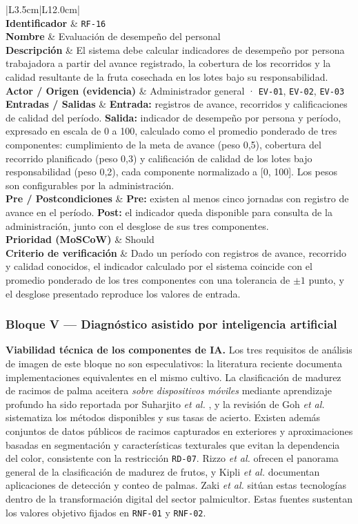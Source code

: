 \documentclass[11pt,a4paper]{article}
\newcommand{\id}[1]{\texttt{\begingroup\hyphenpenalty=10000\relax#1\endgroup}}
\renewcommand{\id}[1]{\texttt{#1}}
\newcommand{\RF}[8]{%
\begin{longtable}{|L{3.5cm}|L{12.0cm}|}
\hline
\rowcolor{grisclaro}\multicolumn{2}{|p{15.7cm}|}{\textbf{#1 --- #2}}\\
\hline
\textbf{Identificador} & \id{#1} \\ \hline
\textbf{Nombre} & #2 \\ \hline
\textbf{Descripción} & #3 \\ \hline
\textbf{Actor / Origen (evidencia)} & #4 \\ \hline
\textbf{Entradas / Salidas} & #5 \\ \hline
\textbf{Pre / Postcondiciones} & #6 \\ \hline
\textbf{Prioridad (MoSCoW)} & #7 \\ \hline
\textbf{Criterio de verificación} & #8 \\ \hline
\caption{#1 --- #2}
\end{longtable}
\vspace{-0.3cm}
}
\begin{document}
\RF{RF-16}{Evaluación de desempeño del personal}
{El sistema debe calcular indicadores de desempeño por persona trabajadora a partir del avance registrado, la cobertura de los recorridos y la calidad resultante de la fruta cosechada en los lotes bajo su responsabilidad.}
{Administrador general · \id{EV-01}, \id{EV-02}, \id{EV-03}}
{\textbf{Entrada:} registros de avance, recorridos y calificaciones de calidad del período. \textbf{Salida:} indicador de desempeño por persona y período, expresado en escala de 0 a 100, calculado como el promedio ponderado de tres componentes: cumplimiento de la meta de avance (peso 0,5), cobertura del recorrido planificado (peso 0,3) y calificación de calidad de los lotes bajo responsabilidad (peso 0,2), cada componente normalizado a [0, 100]. Los pesos son configurables por la administración.}
{\textbf{Pre:} existen al menos cinco jornadas con registro de avance en el período. \textbf{Post:} el indicador queda disponible para consulta de la administración, junto con el desglose de sus tres componentes.}
{Should}
{Dado un período con registros de avance, recorrido y calidad conocidos, el indicador calculado por el sistema coincide con el promedio ponderado de los tres componentes con una tolerancia de $\pm 1$ punto, y el desglose presentado reproduce los valores de entrada.}

\subsubsection{Bloque V --- Diagnóstico asistido por inteligencia artificial}

\noindent\textbf{Viabilidad técnica de los componentes de IA.} Los tres requisitos de análisis de
imagen de este bloque no son especulativos: la literatura reciente documenta implementaciones
equivalentes en el mismo cultivo. La clasificación de madurez de racimos de palma aceitera
\emph{sobre dispositivos móviles} mediante aprendizaje profundo ha sido reportada por Suharjito
\emph{et al.} \cite{suharjito2021}, y la revisión de Goh \emph{et al.} \cite{goh2025} sistematiza
los métodos disponibles y sus tasas de acierto. Existen además conjuntos de datos públicos de
racimos capturados en exteriores \cite{omar2024} y aproximaciones basadas en segmentación y
características texturales \cite{rosbi2024} que evitan la dependencia del color, consistente con la
restricción \id{RD-07}. Rizzo \emph{et al.} \cite{rizzo2023} ofrecen el panorama general de la
clasificación de madurez de frutos, y Kipli \emph{et al.} \cite{kipli2023} documentan aplicaciones
de detección y conteo de palmas. Zaki \emph{et al.} \cite{zaki2025} sitúan estas tecnologías dentro
de la transformación digital del sector palmicultor. Estas fuentes sustentan los valores objetivo
fijados en \id{RNF-01} y \id{RNF-02}.
\end{document}
